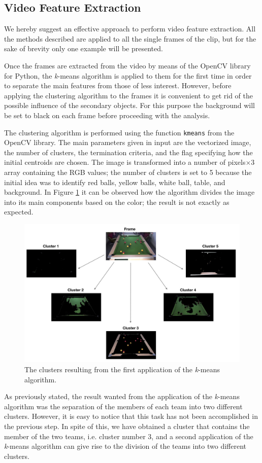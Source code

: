 \documentclass{usiinftr}
\begin{document}
\subsection{Video Feature Extraction}
We hereby suggest an effective approach to perform video feature extraction. All the methods described are applied to all the single frames of the clip, but for the sake of brevity only one example will be presented.

Once the frames are extracted from the video by means of the OpenCV library for Python, the \textit{k}-means algorithm is applied to them for the first time in order to separate the main features from those of less interest. However, before applying the clustering algorithm to the frames it is convenient to get rid of the possible influence of the secondary objects. For this purpose the background will be set to black on each frame before proceeding with the analysis.

The clustering algorithm is performed using the function \texttt{kmeans} from the OpenCV library. The main parameters given in input are the vectorized image, the number of clusters, the termination criteria, and the flag specifying how the initial centroids are chosen. The image is transformed into a number of pixels$\times 3$ array containing the RGB values; the number of clusters is set to 5 because the initial idea was to identify red balls, yellow balls, white ball, table, and background. 
In Figure \ref{fig:5} it can be observed how the algorithm divides the image into its main components based on the color; the result is not exactly as expected. 

\begin{figure}[h]
	\centering
	\includegraphics[width=0.7\linewidth]{./img/cluster1}
	\caption{The clusters resulting from the first application of the \textit{k}-means algorithm.}
	\label{fig:5}
\end{figure}

As previously stated, the result wanted from the application of the \textit{k}-means algorithm was the separation of the members of each team into two different clusters. However, it is easy to notice that this task has not been accomplished in the previous step. In spite of this, we have obtained a cluster that contains the member of the two teams, i.e. cluster number 3, and a second application of the \textit{k}-means algorithm can give rise to the division of the teams into two different clusters.
\end{document}
